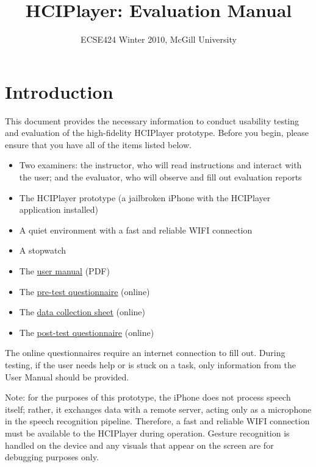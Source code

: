 \documentclass[12pt,letterpaper]{article}
\begin{document}
\title{HCIPlayer: Evaluation Manual}
\author{ECSE424 Winter 2010, McGill University}
\renewcommand{\today}{Updated: Monday, March 8th, 2010}
\maketitle

\section{Introduction}

This document provides the necessary information to conduct usability testing and evaluation of the high-fidelity HCIPlayer prototype. Before you begin, please ensure that you have all of the items listed below.

\begin{itemize}
\item Two examiners: the instructor, who will read instructions and interact with the user; and the evaluator, who will observe and fill out evaluation reports
\item The HCIPlayer prototype (a jailbroken iPhone with the HCIPlayer application installed)
\item A quiet environment with a fast and reliable WIFI connection
\item A stopwatch
\item The \href{http://www.ece.mcgill.ca/~scormi3/hci/docs/user-manual.pdf}{user manual} (PDF)
\item The \href{http://fluidsurveys.com/s/hciplayer-pretest/}{pre-test questionnaire} (online)
\item The \href{http://fluidsurveys.com/s/hciplayer-datacollectionsheet/}{data collection sheet} (online)
\item The \href{http://fluidsurveys.com/s/hciplayer-posttest/}{post-test questionnaire} (online)
\end{itemize}

The online questionnaires require an internet connection to fill out. During testing, if the user needs help or is stuck on a task, only information from the User Manual should be provided.

Note: for the purposes of this prototype, the iPhone does not process speech itself; rather, it exchanges data with a remote server, acting only as a microphone in the speech recognition pipeline. Therefore, a fast and reliable WIFI connection must be available to the HCIPlayer during operation. Gesture recognition is handled on the device and any visuals that appear on the screen are for debugging purposes only.
\end{document}

